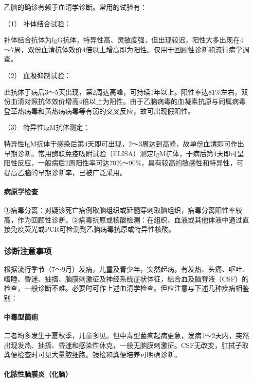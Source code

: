 乙脑的确诊有赖于血清学诊断。常用的试验有：

\hypertarget{text00219.htmlux5cux23CHP7-5-2-4-3-1}{}
（1） 补体结合试验：

补体结合抗体为IgG抗体，特异性高、灵敏度强，但出现较迟，阳性大多出现在4～7周，双份血清抗体效价4倍以上增高即为阳性。仅用于回顾性诊断和流行病学调查。

\hypertarget{text00219.htmlux5cux23CHP7-5-2-4-3-2}{}
（2） 血凝抑制试验：

此抗体于病后3～5天出现，第2周达高峰，可持续1年以上。阳性率达81\%左右，双份血清对照抗体效价增高4倍以上为阳性。由于乙脑病毒的血凝素抗原与同属病毒登革热病毒和黄热病病毒等有弱的交叉反应，故可出现假阳性。

\hypertarget{text00219.htmlux5cux23CHP7-5-2-4-3-3}{}
（3） 特异性IgM抗体测定：

特异性IgM抗体于感染后第4天即可出现，2～3周达到高峰，故单份血清即可作出早期诊断。常用酶联免疫吸附试验（ELISA）测定IgM抗体，于病后第4天即可呈阳性反应，一般病后2周阳性率可达70\%～90\%，具有较高的敏感性和特异性，可提高乙脑的早期诊断率，已被广泛采用。

\paragraph{病原学检查}

①病毒分离：对疑诊死亡病例取脑组织或延髓穿刺取脑组织，病毒分离阳性率较高，作为回顾性诊断。②病毒抗原或核酸检测：在组织、血液或其他体液中通过直接免疫荧光或PCR可检测到乙脑病毒抗原或特异性核酸。

\subsubsection{诊断注意事项}

根据流行季节（7～9月）发病，儿童及青少年，突然起病，有发热、头痛、呕吐、嗜睡、昏迷、抽搐、脑膜刺激征及神经系统症状体征，结合血及脑脊液（CSF）的检查，一般诊断不难。必要时可作上述血清学检查。但应注意与下述几种疾病相鉴别：

\paragraph{中毒型菌痢}

二者均多发生于夏秋季，儿童多见。但中毒型菌痢起病更急，发病1～2天内，突然出现发热、抽搐、昏迷和感染性休克，一般无脑膜刺激征。CSF无改变，肛拭子取粪便检查时可见大量脓细胞。镜检和粪便培养可明确诊断。

\paragraph{化脓性脑膜炎（化脑）}

